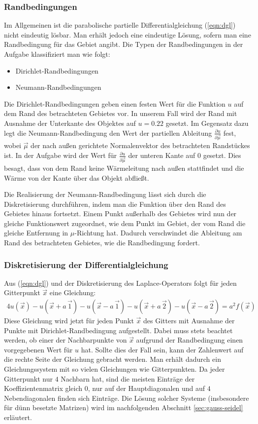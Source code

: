 \documentclass[10pt,a4paper]{article}
\begin{document}
\subsubsection{Randbedingungen}
\label{randbedingungen}
Im Allgemeinen ist die parabolische partielle Differentialgleichung (\ref{eqn:dgl}) nicht eindeutig lösbar. Man erhält jedoch eine eindeutige Lösung, sofern man eine Randbedingung für das Gebiet angibt. Die Typen der Randbedingungen in der Aufgabe klassifiziert man wie folgt:
\begin{itemize}
\item Dirichlet-Randbedingungen
\item Neumann-Randbedingungen
\end{itemize}
Die Dirichlet-Randbedingungen geben einen festen Wert für die Funktion $u$ auf dem Rand des betrachteten Gebietes vor. In unserem Fall wird der Rand mit Ausnahme der Unterkante des Objektes auf $u = \num{0.22}$ gesetzt. 
Im Gegensatz dazu legt die Neumann-Randbedingung den Wert der partiellen Ableitung $\frac{\partial u}{\partial \vec{\mu}}$ fest, wobei $\vec{\mu}$ der nach außen gerichtete Normalenvektor des betrachteten Randstückes ist. In der Aufgabe wird der Wert für $\frac{\partial u}{\partial \vec{\mu}}$ der unteren Kante auf $\num{0}$ gesetzt. Dies besagt, dass von dem Rand keine Wärmeleitung nach außen stattfindet und die Wärme von der Kante über das Objekt abfließt.

Die Realisierung der Neumann-Randbedingung lässt sich durch die Diskretisierung durchführen, indem man die Funktion über den Rand des Gebietes hinaus fortsetzt. Einem Punkt außerhalb des Gebietes wird nun der gleiche Funktionswert zugeordnet, wie dem Punkt im 
Gebiet, der vom Rand die gleiche Entfernung in $\mu$-Richtung hat. Dadurch verschwindet die Ableitung am Rand des betrachteten Gebietes, wie die Randbedingung fordert.


\subsubsection{Diskretisierung der Differentialgleichung}
Aus (\ref{eqn:dgl}) und der Diskretisierung des Laplace-Operators folgt für jeden Gitterpunkt $\vec{x}$ eine Gleichung:
\begin{align}
4 u(\vec{x}) - u(\vec{x}+a\,\vec{1}) - u(\vec{x}-a\,\vec{1}) - u(\vec{x}+a\,\vec{2}) - u(\vec{x}-a\,\vec{2}) = a^2 f(\vec{x})
\label{eqn:dgldiskret}
\end{align}
Diese Gleichung wird jetzt für jeden Punkt $\vec{x}$ des Gitters mit Ausnahme der Punkte mit Dirichlet-Randbedingung aufgestellt. Dabei muss stets beachtet werden, ob einer der Nachbarpunkte von $\vec{x}$ aufgrund der Randbedingung einen vorgegebenen Wert für $u$ hat. Sollte dies der Fall sein, kann der Zahlenwert auf die rechte Seite der Gleichung gebracht werden.
Man erhält dadurch ein Gleichungssystem mit so vielen Gleichungen wie Gitterpunkten. Da jeder Gitterpunkt nur $4$ Nachbarn hat, sind die meisten Einträge der Koeffizientenmatrix gleich $0$, nur auf der Hauptdiagonalen und auf $4$ Nebendiagonalen finden sich Einträge. Die Lösung solcher Systeme (insbesondere für dünn besetzte Matrizen) wird im nachfolgenden Abschnitt \ref{sec:gauss-seidel} erläutert.
\end{document}
